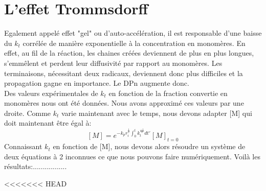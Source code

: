 \documentclass[a4paper,oneside,12pt]{article}
\begin{document}
\section{L'effet Trommsdorff} 
Egalement appelé effet "gel" ou d'auto-accélération, il est responsable d'une baisse du $k_t$ corrélée de manière exponentielle à la concentration en monomères. En effet, au fil de la réaction, les chaines créées deviennent de plus en plus longues, s'emmêlent et perdent leur diffusivité par rapport au monomères. Les terminaisons, nécessitant deux radicaux, deviennent donc plus difficiles et la propagation gagne en importance. Le DPn augmente donc.\\
Des valeurs expérimentales de $k_t$ en fonction de la fraction convertie en monomères nous ont été données. Nous avons approximé ces valeurs par une droite. Comme $k_t$ varie maintenant avec le temps, nous devons adapter [M] qui doit maintenant être égal à:
$$[M]=e^{-k_pr_i^{\frac{1}{2}}\int_0^t k_t^{\frac{-1}{2}}dt'}[M]_{t=0}$$
Connaissant $k_t$ en fonction de [M], nous devons alors résoudre un système de deux équations à 2 inconnues ce que nous pouvons faire numériquement. Voilà les résultats:.................
\space

<<<<<<< HEAD
\end{document}
